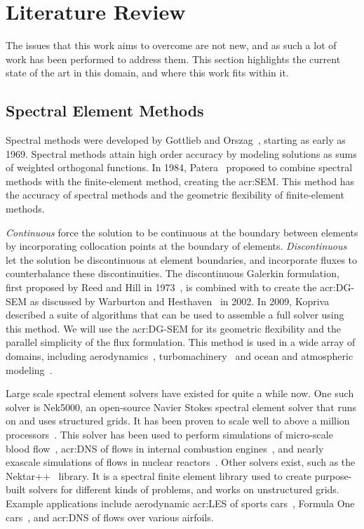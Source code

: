 \chapter{Literature Review}\label{chapter:literature_review}

The issues that this work aims to overcome are not new, and as such a lot of work has been performed
to address them. This section highlights the current state of the art in this domain, and where this
work fits within it.

\section{Spectral Element Methods}\label{section:literature_review:sem}

Spectral methods were developed by Gottlieb and Orszag~\cite{Gottlieb1977}, starting as early as
1969. Spectral methods attain high order accuracy by modeling solutions as sums of weighted
orthogonal functions. In 1984, Patera~\cite{Patera1984} proposed to combine spectral methods with
the finite-element method, creating the \acrfull{acr:SEM}. This method has the accuracy of spectral
methods and the geometric flexibility of finite-element methods.

\textit{Continuous}  force the solution to be continuous at the boundary between
elements by incorporating collocation points at the boundary of elements. \textit{Discontinuous}
 let the solution be discontinuous at element boundaries, and incorporate fluxes
to counterbalance these discontinuities. The discontinuous Galerkin formulation, first proposed by
Reed and Hill in 1973~\cite{Reed1973}, is combined with  to create the
\acrfull{acr:DG-SEM} as discussed by Warburton and Hesthaven~\cite{Hesthaven2002} in 2002. In 2009,
Kopriva~\cite{Kopriva2009} described a suite of algorithms that can be used to assemble a full
solver using this method. We will use the \acrshort{acr:DG-SEM} for its geometric flexibility and
the parallel simplicity of the flux formulation. This method is used in a wide array of domains,
including aerodynamics~\cite{Beck2014}, turbomachinery~\cite{Garai2015} and ocean and atmospheric
modeling~\cite{Gassner2016}.

Large scale spectral element solvers have existed for quite a while now. One such solver is Nek5000,
an open-source Navier Stokes spectral element solver that runs on  and uses
structured grids. It has been proven to scale well to above a million
processors~\cite{Offermans2017}. This solver has been used to perform simulations of micro-scale
blood flow~\cite{Obabko2017}, \acrfull{acr:DNS} of flows in internal combustion
engines~\cite{Ameen2020}, and nearly exascale simulations of flows in nuclear
reactors~\cite{Merzari2020}. Other solvers exist, such as the Nektar++~\cite{Cantwell2015} library.
It is a spectral finite element library used to create purpose-built solvers for different kinds of
problems, and works on unstructured grids. Example applications include aerodynamic
\acrfull{acr:LES} of sports cars~\cite{Mengaldo2020}, Formula One cars~\cite{Cantwell2015}, and
\acrshort{acr:DNS} of flows over various airfoils.

